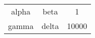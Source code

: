 \begin{table}[htp]
\centering
\begin{tabular}{ccc}
\toprule
alpha 	 & beta 	 & 1 \\
gamma 	 & delta 	 & 10000 \\
\bottomrule
\end{tabular}
\end{table}